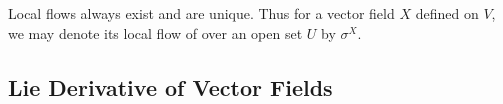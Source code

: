 \documentclass[../main.tex]{subfiles}
\begin{document}
    \begin{theorem}
        Local flows always exist and are unique. Thus for a vector field \(X\) 
        defined on \(V\), we may denote its local flow of over an open set \(U\) 
        by \(\sigma^X\).
    \end{theorem}

    \newpage
    \subsection{Lie Derivative of Vector Fields}
\end{document}
